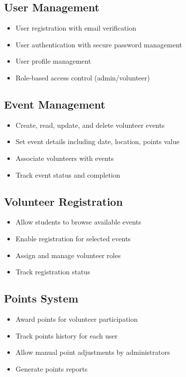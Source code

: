 \documentclass[12pt,a4paper]{report}
\begin{document}
\subsection{User Management}
\begin{itemize}
    \item User registration with email verification
    \item User authentication with secure password management
    \item User profile management
    \item Role-based access control (admin/volunteer)
\end{itemize}

\subsection{Event Management}
\begin{itemize}
    \item Create, read, update, and delete volunteer events
    \item Set event details including date, location, points value
    \item Associate volunteers with events
    \item Track event status and completion
\end{itemize}

\subsection{Volunteer Registration}
\begin{itemize}
    \item Allow students to browse available events
    \item Enable registration for selected events
    \item Assign and manage volunteer roles
    \item Track registration status
\end{itemize}

\subsection{Points System}
\begin{itemize}
    \item Award points for volunteer participation
    \item Track points history for each user
    \item Allow manual point adjustments by administrators
    \item Generate points reports
\end{itemize}
\end{document}
